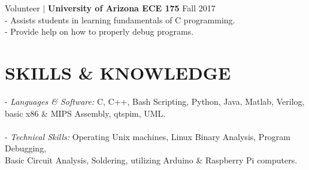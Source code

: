 \documentclass[line, 12pt]{res}
\newcommand\tab[1][0.5cm]{\hspace*{#1}}
\begin{document}
\begin{resume}
	Volunteer $\mid$ \textbf{University of Arizona ECE 175} \hfill Fall 2017 \\
		\tab - Assists students in learning fundamentals of C programming. \\
		\tab - Provide help on how to properly debug programs.

\section{SKILLS \& KNOWLEDGE} 
	- {\sl Languages \& Software:} C, C++, Bash Scripting, Python, Java, Matlab, Verilog, \\ \tab[4.48cm] basic x86 \& MIPS Assembly, qtspim, UML. \\ \\
	- {\sl Technical Skills:} Operating Unix machines, Linux Binary Analysis, Program Debugging, \\ \tab[3.25cm] Basic Circuit Analysis, Soldering, utilizing Arduino \& Raspberry Pi computers.
 

\end{resume}
\end{document}
